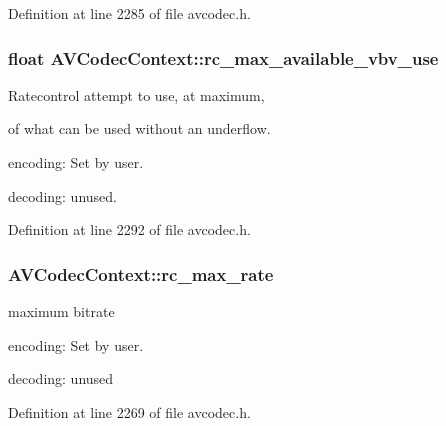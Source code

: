 Definition at line 2285 of file avcodec.\+h.

\subsubsection[{\texorpdfstring{rc\+\_\+max\+\_\+available\+\_\+vbv\+\_\+use}{rc_max_available_vbv_use}}]{\setlength{\rightskip}{0pt plus 5cm}float A\+V\+Codec\+Context\+::rc\+\_\+max\+\_\+available\+\_\+vbv\+\_\+use}\hypertarget{struct_a_v_codec_context_a023d28b8d65fe09ded1987cdea18dddb}{}\label{struct_a_v_codec_context_a023d28b8d65fe09ded1987cdea18dddb}
Ratecontrol attempt to use, at maximum, 

of what can be used without an underflow.
\begin{DoxyItemize}
\item encoding\+: Set by user.
\item decoding\+: unused. 
\end{DoxyItemize}

Definition at line 2292 of file avcodec.\+h.

\subsubsection[{\texorpdfstring{rc\+\_\+max\+\_\+rate}{rc_max_rate}}]{ A\+V\+Codec\+Context\+::rc\+\_\+max\+\_\+rate}\hypertarget{struct_a_v_codec_context_a055dd5071b96565ab541d4c775e7f1f3}{}\label{struct_a_v_codec_context_a055dd5071b96565ab541d4c775e7f1f3}
maximum bitrate
\begin{DoxyItemize}
\item encoding\+: Set by user.
\item decoding\+: unused 
\end{DoxyItemize}

Definition at line 2269 of file avcodec.\+h.

